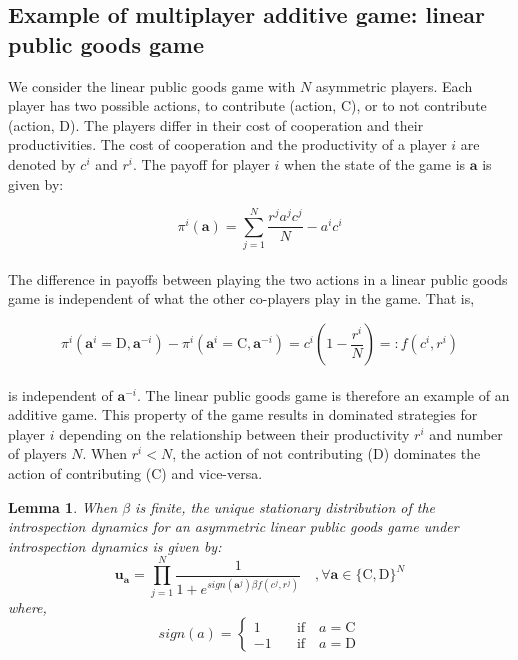 \documentclass[11pt]{article}
\theoremstyle{plainCl1}
\theoremstyle{plainCl2}
\newtheorem{lemma}{Lemma}
\newcommand{\abf}{\mathbf{a}}
\newcommand{\ubf}{\mathbf{u}}
\newcommand{\C}{\mathrm{C}}
\newcommand{\D}{\mathrm{D}}
\begin{document}
\subsection*{Example of multiplayer additive game: linear public goods game}
We consider the linear public goods game with $N$ asymmetric players. Each player has two possible actions, to contribute (action, $\C$), or to not contribute (action, $\D$). The players differ in their cost of cooperation and their productivities. The cost of cooperation and the productivity of a player $i$ are denoted by $c^i$ and $r^i$.  The payoff for player $i$ when the state of the game is $\abf$ is given by: 

\begin{equation}
\pi^i(\abf) = \sum_{j=1}^N \frac{\displaystyle r^j a^j c^j}{N} - a^i c^i
\label{Eq:linear-pgg-payoff}
\end{equation}
\\
\noindent The difference in payoffs between playing the two actions in a linear public goods game is independent of what the other co-players play in the game. That is, 

\begin{equation}
\pi^i(\abf^i = \D, \abf^{-i}) - \pi^i(\abf^i = \C, \abf^{-i}) = c^i \left(1 - \frac{r^i}{N} \right) =: f(c^i, r^i) 
\label{Eq:difference-payoffs-lpgg}
\end{equation}
\\
\noindent is independent of $\abf^{-i}$. The linear public goods game is therefore an example of an additive game. This property of the game results in dominated strategies for player $i$ depending on the relationship between their productivity $r^i$ and number of players $N$. When $r^i < N$, the action of not contributing ($\D$) dominates the action of contributing ($\C$) and vice-versa. 
\\
\begin{lemma}
\label{prop:stationary-dist-lpgg}
When $\beta$ is finite, the unique stationary distribution of the introspection dynamics for an asymmetric linear public goods game under introspection dynamics is given by: 
\\
\begin{equation}
\ubf_\abf = \prod_{j = 1}^{N} \frac{1}{1 + \displaystyle e^{\mathit{sign}(\abf^j)\beta f(c^j, r^j )}} \quad ,\forall \abf \in \{\C, \D\}^N
\label{Eq:stationary_dist_lpgg}
\end{equation}
where, 
\begin{equation}
\label{Eq:sign-function}
\mathit{sign}(a) =
\begin{cases}
1& \quad \text{if} \quad a = \C \\
-1& \quad \text{if} \quad a = \D
\end{cases}
\end{equation}
\end{lemma}
\end{document}
